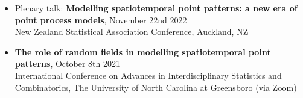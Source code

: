 \documentclass[10pt,a4paper]{moderncv}
\begin{document}
\begin{itemize}
  
    
    
    \item Plenary talk: \textbf{Modelling spatiotemporal point patterns: a new era of point process models}, November 22nd 2022\\
    { New Zealand Statistical Association Conference, Auckland, NZ}
    
    
    \item \textbf{The role of random fields in modelling spatiotemporal point patterns}, October 8th 2021\\
    { International Conference on Advances in Interdisciplinary Statistics and Combinatorics, The University of North Carolina at Greensboro (via Zoom)}
    
    
    
    

\end{itemize}
\end{document}
